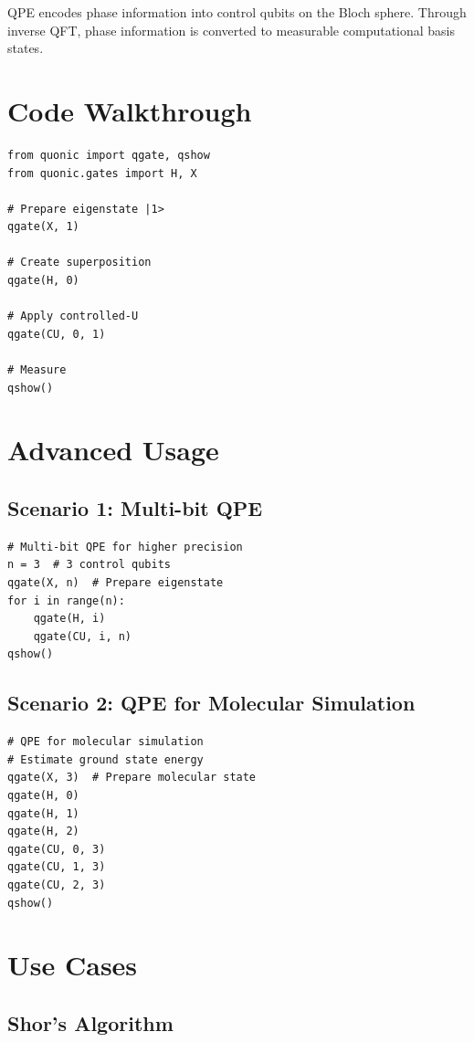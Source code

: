 \documentclass[12pt,a4paper]{article}
\begin{document}
QPE encodes phase information into control qubits on the Bloch sphere. Through inverse QFT, phase information is converted to measurable computational basis states.

\section{Code Walkthrough}

\begin{verbatim}
from quonic import qgate, qshow
from quonic.gates import H, X

# Prepare eigenstate |1>
qgate(X, 1)

# Create superposition
qgate(H, 0)

# Apply controlled-U
qgate(CU, 0, 1)

# Measure
qshow()
\end{verbatim}

\section{Advanced Usage}

\subsection{Scenario 1: Multi-bit QPE}

\begin{verbatim}
# Multi-bit QPE for higher precision
n = 3  # 3 control qubits
qgate(X, n)  # Prepare eigenstate
for i in range(n):
    qgate(H, i)
    qgate(CU, i, n)
qshow()
\end{verbatim}

\subsection{Scenario 2: QPE for Molecular Simulation}

\begin{verbatim}
# QPE for molecular simulation
# Estimate ground state energy
qgate(X, 3)  # Prepare molecular state
qgate(H, 0)
qgate(H, 1)
qgate(H, 2)
qgate(CU, 0, 3)
qgate(CU, 1, 3)
qgate(CU, 2, 3)
qshow()
\end{verbatim}

\section{Use Cases}

\subsection{Shor's Algorithm}
\end{document}
